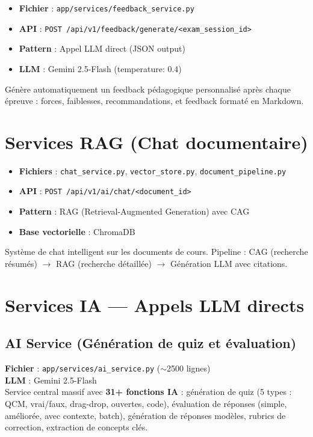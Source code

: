 \documentclass[12pt,a4paper]{article}
\begin{document}
\begin{itemize}[leftmargin=*]
    \item \textbf{Fichier} : \texttt{app/services/feedback\_service.py}
    \item \textbf{API} : \texttt{POST /api/v1/feedback/generate/<exam\_session\_id>}
    \item \textbf{Pattern} : Appel LLM direct (JSON output)
    \item \textbf{LLM} : Gemini 2.5-Flash (temperature: 0.4)
\end{itemize}

Génère automatiquement un feedback pédagogique personnalisé après chaque épreuve : forces, faiblesses, recommandations, et feedback formaté en Markdown.

\section{Services RAG (Chat documentaire)}

\begin{itemize}[leftmargin=*]
    \item \textbf{Fichiers} : \texttt{chat\_service.py}, \texttt{vector\_store.py}, \texttt{document\_pipeline.py}
    \item \textbf{API} : \texttt{POST /api/v1/ai/chat/<document\_id>}
    \item \textbf{Pattern} : RAG (Retrieval-Augmented Generation) avec CAG
    \item \textbf{Base vectorielle} : ChromaDB
\end{itemize}

Système de chat intelligent sur les documents de cours. Pipeline : CAG (recherche résumés) $\rightarrow$ RAG (recherche détaillée) $\rightarrow$ Génération LLM avec citations.

\section{Services IA --- Appels LLM directs}

\subsection{AI Service (Génération de quiz et évaluation)}
\textbf{Fichier} : \texttt{app/services/ai\_service.py} ($\sim$2500 lignes) \\
\textbf{LLM} : Gemini 2.5-Flash \\
Service central massif avec \textbf{31+ fonctions IA} : génération de quiz (5 types : QCM, vrai/faux, drag-drop, ouvertes, code), évaluation de réponses (simple, améliorée, avec contexte, batch), génération de réponses modèles, rubrics de correction, extraction de concepts clés.
\end{document}
